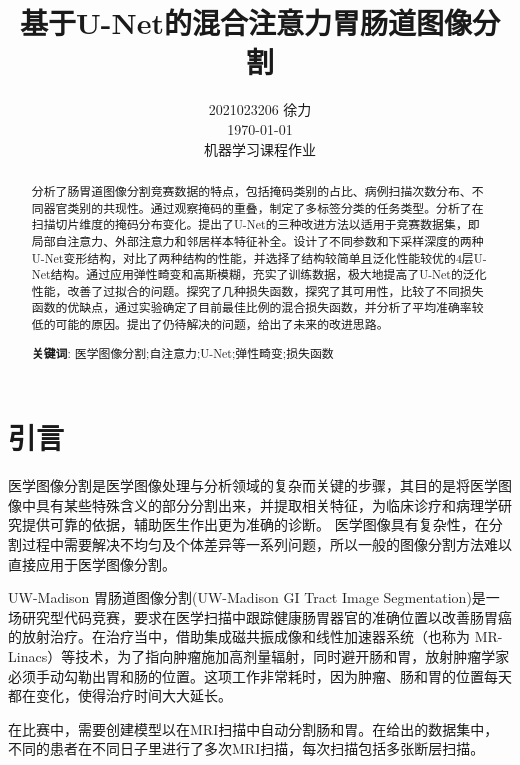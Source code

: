 \documentclass[letterpaper, 10pt, conference, twoside]{ieeeconf}
\title{\LARGE \bf
基于U-Net的混合注意力胃肠道图像分割
}
\author{2021023206 \quad 徐力\\ \today\\ 机器学习课程作业}
\begin{document}
\maketitle



\begin{abstract}
  分析了肠胃道图像分割竞赛数据的特点，包括掩码类别的占比、病例扫描次数分布、不同器官类别的共现性。通过观察掩码的重叠，制定了多标签分类的任务类型。分析了在扫描切片维度的掩码分布变化。提出了U-Net的三种改进方法以适用于竞赛数据集，即局部自注意力、外部注意力和邻居样本特征补全。设计了不同参数和下采样深度的两种U-Net变形结构，对比了两种结构的性能，并选择了结构较简单且泛化性能较优的4层U-Net结构。通过应用弹性畸变和高斯模糊，充实了训练数据，极大地提高了U-Net的泛化性能，改善了过拟合的问题。探究了几种损失函数，探究了其可用性，比较了不同损失函数的优缺点，通过实验确定了目前最佳比例的混合损失函数，并分析了平均准确率较低的可能的原因。提出了仍待解决的问题，给出了未来的改进思路。

\vspace{1ex}\noindent\textbf{关键词}: 医学图像分割;自注意力;U-Net;弹性畸变;损失函数

\end{abstract}


\section{引言}
医学图像分割是医学图像处理与分析领域的复杂而关键的步骤，其目的是将医学图像中具有某些特殊含义的部分分割出来，并提取相关特征，为临床诊疗和病理学研究提供可靠的依据，辅助医生作出更为准确的诊断。 医学图像具有复杂性，在分割过程中需要解决不均匀及个体差异等一系列问题，所以一般的图像分割方法难以直接应用于医学图像分割\cite{c1}。

UW-Madison 胃肠道图像分割(UW-Madison GI Tract Image Segmentation)是一场研究型代码竞赛\cite{c2}，要求在医学扫描中跟踪健康肠胃器官的准确位置以改善肠胃癌的放射治疗。在治疗当中，借助集成磁共振成像和线性加速器系统（也称为 MR-Linacs）等技术，为了指向肿瘤施加高剂量辐射，同时避开肠和胃，放射肿瘤学家必须手动勾勒出胃和肠的位置。这项工作非常耗时，因为肿瘤、肠和胃的位置每天都在变化，使得治疗时间大大延长。

在比赛中，需要创建模型以在MRI扫描中自动分割肠和胃。在给出的数据集中，不同的患者在不同日子里进行了多次MRI扫描，每次扫描包括多张断层扫描。
\end{document}
